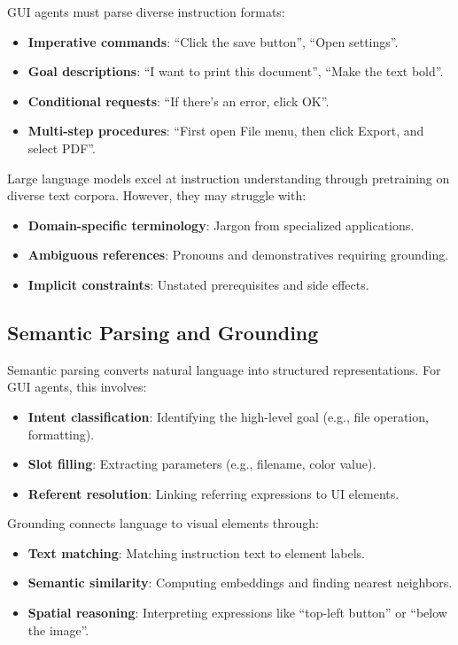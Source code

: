 \documentclass[11pt]{article}
\begin{document}
GUI agents must parse diverse instruction formats:

\begin{itemize}
    \item \textbf{Imperative commands}: ``Click the save button'', ``Open settings''.
    \item \textbf{Goal descriptions}: ``I want to print this document'', ``Make the text bold''.
    \item \textbf{Conditional requests}: ``If there's an error, click OK''.
    \item \textbf{Multi-step procedures}: ``First open File menu, then click Export, and select PDF''.
\end{itemize}

Large language models excel at instruction understanding through pretraining on diverse text corpora. However, they may struggle with:

\begin{itemize}
    \item \textbf{Domain-specific terminology}: Jargon from specialized applications.
    \item \textbf{Ambiguous references}: Pronouns and demonstratives requiring grounding.
    \item \textbf{Implicit constraints}: Unstated prerequisites and side effects.
\end{itemize}

\subsection{Semantic Parsing and Grounding}

Semantic parsing converts natural language into structured representations. For GUI agents, this involves:

\begin{itemize}
    \item \textbf{Intent classification}: Identifying the high-level goal (e.g., file operation, formatting).
    \item \textbf{Slot filling}: Extracting parameters (e.g., filename, color value).
    \item \textbf{Referent resolution}: Linking referring expressions to UI elements.
\end{itemize}

Grounding connects language to visual elements through:

\begin{itemize}
    \item \textbf{Text matching}: Matching instruction text to element labels.
    \item \textbf{Semantic similarity}: Computing embeddings and finding nearest neighbors.
    \item \textbf{Spatial reasoning}: Interpreting expressions like ``top-left button'' or ``below the image''.
\end{itemize}
\end{document}
